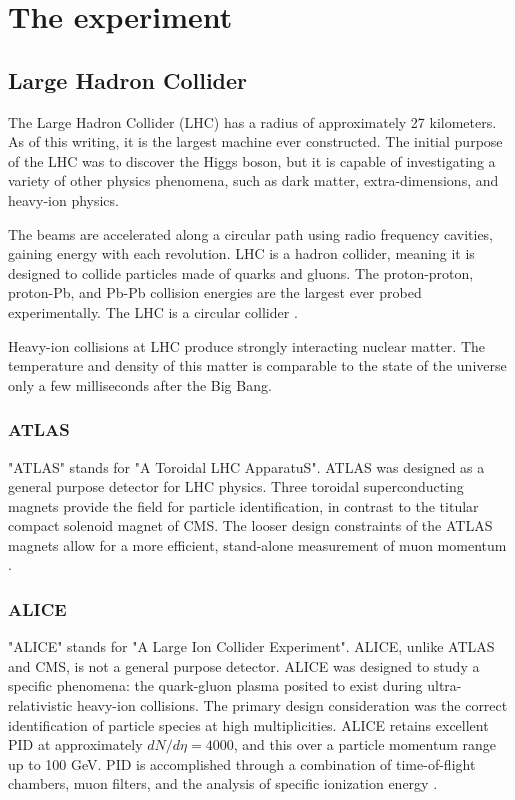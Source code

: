 \setlength\abovedisplayskip{0.4pt}
\setlength\belowdisplayskip{0.4pt}

\chapter{The experiment}

\section{Large Hadron Collider}

The Large Hadron Collider (LHC) has a radius of approximately 27 kilometers. As of this writing, it is the largest machine ever constructed. The initial purpose of the LHC was to discover the Higgs boson, but it is capable of investigating a variety of other physics phenomena, such as dark matter, extra-dimensions, and heavy-ion physics.

The beams are accelerated along a circular path using radio frequency cavities, gaining energy with each revolution. LHC is a hadron collider, meaning it is designed to collide particles made of quarks and gluons. The proton-proton, proton-Pb, and Pb-Pb collision energies are the largest ever probed experimentally. The LHC is a circular collider \cite{Evans:2008zzb}.

Heavy-ion collisions at LHC produce strongly interacting nuclear matter. The temperature and density of this matter is comparable to the state of the universe only a few milliseconds after the Big Bang.

\subsection{ATLAS}

"ATLAS" stands for "A Toroidal LHC ApparatuS". ATLAS was designed as a general purpose detector for LHC physics. Three toroidal superconducting magnets provide the field for particle identification, in contrast to the titular compact solenoid magnet of CMS. The looser design constraints of the ATLAS magnets allow for a more efficient, stand-alone measurement of muon momentum \cite{Aad:2008zzm}. 

\subsection{ALICE}

"ALICE" stands for "A Large Ion Collider Experiment". ALICE, unlike ATLAS and CMS, is not a general purpose detector. ALICE was designed to study a specific phenomena: the quark-gluon plasma posited to exist during ultra-relativistic heavy-ion collisions. The primary design consideration was the correct identification of particle species at high multiplicities. ALICE retains excellent PID at approximately $dN / d\eta = 4000$, and this over a particle momentum range up to 100 GeV. PID is accomplished through a combination of time-of-flight chambers, muon filters, and the analysis of specific ionization energy \cite{Aamodt:2008zz}. 

